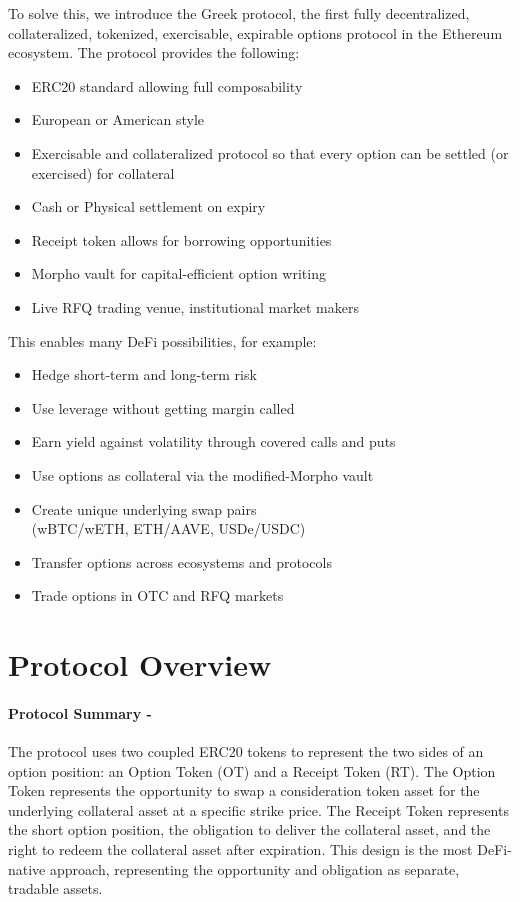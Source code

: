 \documentclass[%
 reprint,
 amsmath,amssymb,
 aps,
 prl,
floatfix,
]{revtex4-2}
\newcommand{\greekfi}{Greek }
\begin{document}
To solve this, we introduce the \greekfi protocol,
the first fully decentralized, collateralized, tokenized,
exercisable, expirable options protocol in the Ethereum ecosystem.
The protocol provides the following:
\begin{itemize}
  \setlength{\itemsep}{0pt}
  \setlength{\parskip}{0pt}
  \item ERC20 standard allowing full composability
  \item European or American style
  \item Exercisable and collateralized protocol so that every option can be
     settled (or exercised) for collateral
  \item Cash or Physical settlement on expiry
  \item Receipt token allows for borrowing opportunities
  \item Morpho vault for capital-efficient option writing
  \item Live RFQ trading venue, institutional market makers
\end{itemize}

This enables many DeFi possibilities, for example:

\begin{itemize}
  \setlength{\itemsep}{0pt}
  \setlength{\parskip}{0pt}
  \item Hedge short-term and long-term risk
  \item Use leverage without getting margin called
  \item Earn yield against volatility through covered calls and puts
  \item Use options as collateral via the modified-Morpho vault
  \item Create unique underlying swap pairs \\ (wBTC/wETH, ETH/AAVE, USDe/USDC)
  \item Transfer options across ecosystems and protocols
  \item Trade options in OTC and RFQ markets
\end{itemize}

\section{Protocol Overview}
\paragraph*{Protocol Summary -}
The protocol uses two coupled ERC20 tokens to represent the two sides of an option position: an Option Token (OT) and a Receipt Token (RT). 
The Option Token represents the opportunity to swap a consideration token asset for the underlying collateral asset at a specific strike price.
The Receipt Token represents the short option position, the obligation to deliver the collateral asset, and the right to redeem the collateral asset after expiration. 
This design is the most DeFi-native approach, representing the opportunity and obligation as separate, tradable assets.
\end{document}
